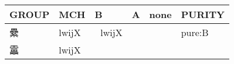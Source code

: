 \documentclass[14pt,a4paper]{scrartcl}
\begin{document}
\begin{longtable}[c]{@{}llllll@{}}
\toprule
\begin{minipage}[b]{0.14\columnwidth}\raggedright\strut
GROUP
\strut\end{minipage} &
\begin{minipage}[b]{0.14\columnwidth}\raggedright\strut
MCH
\strut\end{minipage} &
\begin{minipage}[b]{0.14\columnwidth}\raggedright\strut
B
\strut\end{minipage} &
\begin{minipage}[b]{0.14\columnwidth}\raggedright\strut
A
\strut\end{minipage} &
\begin{minipage}[b]{0.14\columnwidth}\raggedright\strut
none
\strut\end{minipage} &
\begin{minipage}[b]{0.14\columnwidth}\raggedright\strut
PURITY
\strut\end{minipage}\tabularnewline
\midrule
\endhead
\begin{minipage}[t]{0.14\columnwidth}\raggedright\strut
纍
\strut\end{minipage} &
\begin{minipage}[t]{0.14\columnwidth}\raggedright\strut
lwijX
\strut\end{minipage} &
\begin{minipage}[t]{0.14\columnwidth}\raggedright\strut
𧮢 lwijX
\strut\end{minipage} &
\begin{minipage}[t]{0.14\columnwidth}\raggedright\strut
\strut\end{minipage} &
\begin{minipage}[t]{0.14\columnwidth}\raggedright\strut
\strut\end{minipage} &
\begin{minipage}[t]{0.14\columnwidth}\raggedright\strut
pure:B
\strut\end{minipage}\tabularnewline
\begin{minipage}[t]{0.14\columnwidth}\raggedright\strut
靁
\strut\end{minipage} &
\begin{minipage}[t]{0.14\columnwidth}\raggedright\strut
lwijX
\strut\end{minipage} &
\begin{minipage}[t]{0.14\columnwidth}\raggedright\strut
\strut\end{minipage} &
\begin{minipage}[t]{0.14\columnwidth}\raggedright\strut

\end{minipage}
\end{longtable}
\end{document}
